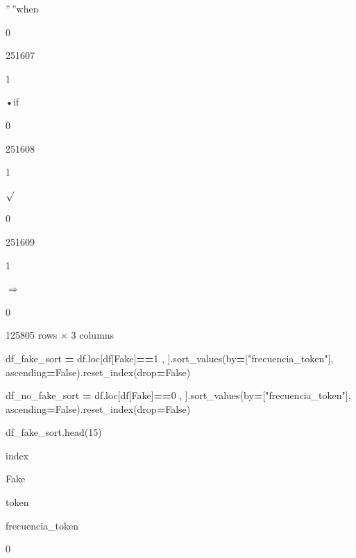 \documentclass[
  11pt,
  a4paper,
]{article}
\newenvironment{Shaded}{\begin{snugshade}}{\end{snugshade}}
\newcommand{\DecValTok}[1]{\textcolor[rgb]{0.00,0.00,0.81}{#1}}
\newcommand{\NormalTok}[1]{#1}
\newcommand{\OperatorTok}[1]{\textcolor[rgb]{0.81,0.36,0.00}{\textbf{#1}}}
\newcommand{\StringTok}[1]{\textcolor[rgb]{0.31,0.60,0.02}{#1}}
\newcommand{\VariableTok}[1]{\textcolor[rgb]{0.00,0.00,0.00}{#1}}
\begin{document}
''\,''when

0

251607

1

•if

0

251608

1

\(\surd\)

0

251609

1

\(\Rightarrow\)

0

125805 rows × 3 columns

\begin{Shaded}
\begin{Highlighting}[]
\NormalTok{df\_fake\_sort }\OperatorTok{=}\NormalTok{ df.loc[df[}\StringTok{\textquotesingle{}Fake\textquotesingle{}}\NormalTok{]}\OperatorTok{==}\DecValTok{1}\NormalTok{ , ].sort\_values(by}\OperatorTok{=}\NormalTok{[}\StringTok{"frecuencia\_token"}\NormalTok{], ascending}\OperatorTok{=}\VariableTok{False}\NormalTok{).reset\_index(drop}\OperatorTok{=}\VariableTok{False}\NormalTok{)}
\end{Highlighting}
\end{Shaded}

\begin{Shaded}
\begin{Highlighting}[]
\NormalTok{df\_no\_fake\_sort }\OperatorTok{=}\NormalTok{ df.loc[df[}\StringTok{\textquotesingle{}Fake\textquotesingle{}}\NormalTok{]}\OperatorTok{==}\DecValTok{0}\NormalTok{ , ].sort\_values(by}\OperatorTok{=}\NormalTok{[}\StringTok{"frecuencia\_token"}\NormalTok{], ascending}\OperatorTok{=}\VariableTok{False}\NormalTok{).reset\_index(drop}\OperatorTok{=}\VariableTok{False}\NormalTok{)}
\end{Highlighting}
\end{Shaded}

\begin{Shaded}
\begin{Highlighting}[]
\NormalTok{df\_fake\_sort.head(}\DecValTok{15}\NormalTok{)}
\end{Highlighting}
\end{Shaded}

index

Fake

token

frecuencia\_token

0
\end{document}
